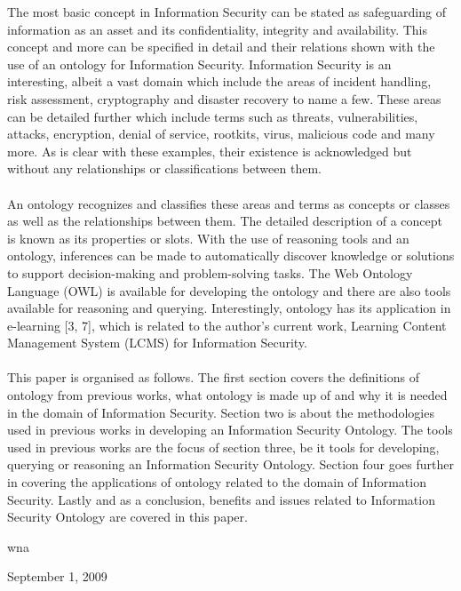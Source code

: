 \documentclass[conference, compsoc]{IEEEtran}
\begin{document}
The most basic concept in Information Security can be stated as  safeguarding of information as an asset and its confidentiality, integrity and availability. This concept and more can be specified in detail and their relations shown with the use of an ontology for Information Security. Information Security is an interesting, albeit a vast domain which include the areas of incident handling, risk assessment, cryptography and disaster recovery to name a few. These areas can be detailed further which include terms such as threats, vulnerabilities, attacks, encryption, denial of service, rootkits, virus, malicious code and many more. As is clear with these examples, their existence is acknowledged but without any relationships or classifications between them.
\\
\\
An ontology recognizes and classifies these areas and terms as concepts or classes as well as the relationships between them. The detailed description of a concept is known as its properties or slots. With the use of reasoning tools and an ontology, inferences can be made to automatically discover knowledge or solutions to support decision-making and problem-solving tasks. The Web Ontology Language (OWL) is available for developing the ontology and there are also tools available for reasoning and querying. Interestingly, ontology has its application in e-learning [3, 7], which is related to the author's current work, Learning Content Management System (LCMS) for Information Security.
\\
\\
This paper is organised as follows. The first section covers the definitions of ontology from previous works, what ontology is made up of and why it is needed in the domain of Information Security. Section two is about the methodologies used in previous works in developing an Information Security Ontology. The tools used in previous works are the focus of section three, be it tools for developing, querying or reasoning an Information Security Ontology. Section four goes further in covering the applications of ontology related to the domain of Information Security. Lastly and as a conclusion, benefits and issues related to Information Security Ontology are covered in this paper.  



\hfill wna
 
\hfill September 1, 2009
\end{document}
